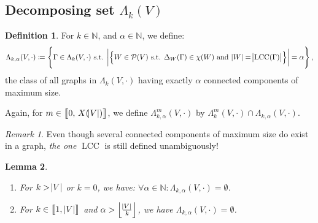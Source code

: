 \documentclass{article}
\newtheorem{lemma}{Lemma}[section]
\theoremstyle{definition}
\newtheorem{definition}[lemma]{Definition}
\theoremstyle{remark}
\newtheorem*{remark}{Remark}
\DeclareMathOperator{\LCC}{LCC}
\newcommand{\N}{\mathbb N}
\newcommand{\intint}[2]{\left\llbracket#1, \, #2\right\rrbracket}
\newcommand{\floor}[1]{\left\lfloor#1\right\rfloor}
\newcommand{\st}{\text{ s.t. }}
\begin{document}
	\subsection{Decomposing set $\Lambda_k(V)$}
		\begin{definition} For $k \in \N$, and $\alpha \in \N$, we define:
		\[\Lambda_{k,\alpha}(V, \cdot) \coloneqq \left\{\Gamma \in \Lambda_k(V, \cdot) \st
			\abs {\left\{W \in \mathcal P(V) \st \Delta_W(\Gamma) \in \chi(W) \text{ and } \abs W = \abs {\LCC(\Gamma)}\right\}} = \alpha\right\},\]
		the class of all graphs in $\Lambda_k(V, \cdot)$ having exactly $\alpha$ connected components of maximum size.

		Again, for $m \in \intint 0{X(\abs V)}$, we define $\Lambda_{k,\alpha}^m(V, \cdot)$ by $\Lambda_k^m(V, \cdot) \cap \Lambda_{k,\alpha}(V, \cdot)$.
		\end{definition}

		\begin{remark} Even though several connected components of maximum size do exist in a graph, \textit{the one} $\LCC$ is still defined unambiguously!
		\end{remark}

		\begin{lemma}~
		\begin{enumerate}
			\item For $k > \abs V$ or $k=0$, we have: $\forall \alpha \in \N : \Lambda_{k,\alpha}(V, \cdot) = \emptyset$.
			\item For $k \in \intint 1{\abs V}$ and $\alpha > \floor {\frac {\abs V}k}$, we have $\Lambda_{k,\alpha}(V, \cdot) = \emptyset$.
		\end{enumerate}
		\end{lemma}
\end{document}
